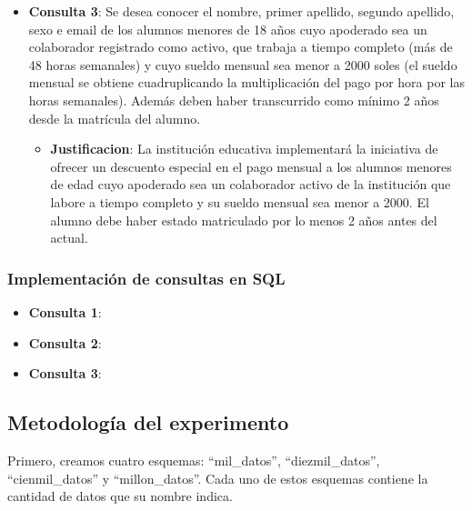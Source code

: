 \begin{itemize}
\begin{itemize}
            \end{itemize}
      \item{\textbf{Consulta 3}: Se desea conocer el nombre, primer apellido, segundo apellido, sexo e email de los alumnos menores de 18 años cuyo apoderado sea un colaborador registrado como activo, que trabaja a tiempo completo (más de 48 horas semanales) y cuyo sueldo mensual sea menor a 2000 soles (el sueldo mensual se obtiene cuadruplicando la multiplicación del pago por hora por las horas semanales). Además deben haber transcurrido como mínimo 2 años desde la matrícula del alumno.}
            \begin{itemize}
                  \item{\textbf{Justificacion}: La institución educativa implementará la iniciativa de ofrecer un descuento especial en el pago mensual a los alumnos menores de edad cuyo apoderado sea un colaborador activo de la institución que labore a tiempo completo y su sueldo mensual sea menor a 2000. El alumno debe haber estado matriculado por lo menos 2 años antes del actual.}
            \end{itemize}
\end{itemize}
\subsubsection{Implementación de consultas en SQL}
\begin{itemize}
      \item{\textbf{Consulta 1}:
            }
      \item{\textbf{Consulta 2}:
            }
      \item{\textbf{Consulta 3}:
            }
\end{itemize}
\subsection{Metodología del experimento}
\begin{sloppypar}
      Primero, creamos cuatro esquemas: ``mil\_datos'', ``diezmil\_datos'', ``cienmil\_datos'' y ``millon\_datos''. Cada uno de estos esquemas contiene la cantidad de datos que su nombre indica.
\end{sloppypar}


